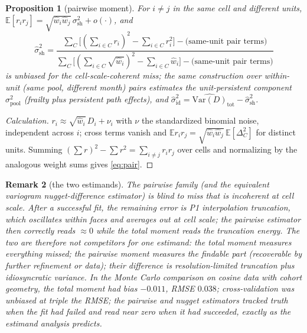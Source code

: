 \documentclass[11pt]{article}
\newtheorem{proposition}{Proposition}[section]
\newtheorem{remark}[proposition]{Remark}
\newcommand{\E}{\mathbb{E}}
\newcommand{\Var}{\mathrm{Var}}
\begin{document}
\begin{proposition}[pairwise moment]\label{prop:pair}
For $i\neq j$ in the same cell and different units,
$\E[r_ir_j]=\sqrt{\hat w_i\hat w_j}\,\sigma_{\mathrm{sh}}^2+o(\cdot)$, and
\begin{equation}\label{eq:pair}
\hat\sigma^2_{\mathrm{sh}}
=\frac{\sum_C\bigl[(\sum_{i\in C}r_i)^2-\sum_{i\in C}r_i^2\bigr]
-\text{(same-unit pair terms)}}
{\sum_C\bigl[(\sum_{i\in C}\sqrt{\hat w_i})^2-\sum_{i\in C}\hat w_i\bigr]
-\text{(same-unit pair terms)}}
\end{equation}
is unbiased for the cell-scale-coherent miss; the same construction over within-unit
(same pool, different month) pairs estimates the unit-persistent component
$\sigma_{\mathrm{pool}}^2$ (frailty plus persistent path effects), and
$\hat\sigma^2_{\mathrm{id}}=\widehat{\Var(D)}_{\mathrm{tot}}-\hat\sigma^2_{\mathrm{sh}}$.
\end{proposition}
\begin{proof}[Calculation]
$r_i\approx\sqrt{\hat w_i}\,D_i+\nu_i$ with $\nu$ the standardized binomial noise,
independent across $i$; cross terms vanish and
$\E r_ir_j=\sqrt{\hat w_i\hat w_j}\,\E[\Delta_C^2]$ for distinct units. Summing
$(\sum r)^2-\sum r^2=\sum_{i\neq j}r_ir_j$ over cells and normalizing by the analogous
weight sums gives \eqref{eq:pair}.
\end{proof}

\begin{remark}[the two estimands]\label{rem:estimands}
The pairwise family (and the equivalent variogram nugget-difference estimator) is blind
to miss that is incoherent at cell scale. After a \emph{successful} fit, the remaining
error is P1 interpolation truncation, which oscillates within faces and averages out at
cell scale; the pairwise estimator then correctly reads $\approx 0$ while the total
moment reads the truncation energy. The two are therefore not competitors for one
estimand: the total moment measures everything missed; the pairwise moment measures the
\emph{findable} part (recoverable by further refinement or data); their difference is
resolution-limited truncation plus idiosyncratic variance. In the Monte Carlo
comparison on cosine data with cohort geometry, the total moment had bias $-0.011$,
RMSE $0.038$; cross-validation was unbiased at triple the RMSE; the pairwise and
nugget estimators tracked truth when the fit had failed and read near zero when it had
succeeded, exactly as the estimand analysis predicts.
\end{remark}
\end{document}
